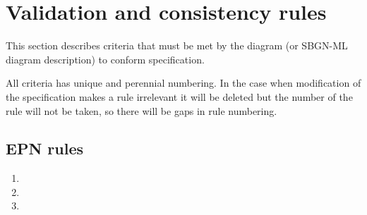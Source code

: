 \chapter{Validation and consistency rules}

\newcommand{\validationRule}     [1]{\item[#1.~]}

This section describes criteria that must be met by the diagram (or SBGN-ML diagram description) to conform
\SBGNPDLone specification. 

All criteria has unique and perennial numbering. In the case when modification of the specification makes a rule
irrelevant it will be deleted but the number of the rule will not be taken, so there will be gaps in rule numbering.

\section{EPN rules} 
\begin{enumerate}
\validationRule{000001}
\validationRule{000002}
\validationRule{000003}
\end{enumerate}
